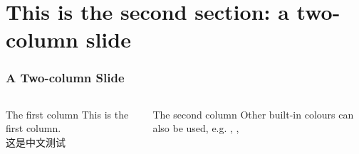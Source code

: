 \documentclass[10pt]{beamer}
\begin{document}
\section{This is the second section: a two-column slide}
\begin{frame}
\frametitle{A Two-column Slide}
\begin{columns} 
\begin{column}{0.5\textwidth} 
\begin{block}{The first column}
This is the first column.\\
这是中文测试\\
\\
\\
\\
\\
\end{block}
\end{column}
\begin{column}{0.5\textwidth} 
\begin{block}{The second column}
{\color{coreBlue}{This is the only ``Beihang colour'' I found. }} Other built-in colours can also be used, e.g. {\color{red}{red}}, {\color{orange}{orange}}, {\color{blue}{blue}}
\vspace{9.5em}
\end{block}
\end{column}
\end{columns}
\end{frame}
\end{document}
